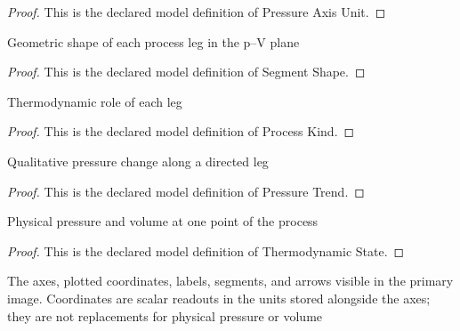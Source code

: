 \begin{proof}
  This is the declared model definition of Pressure Axis Unit.
\end{proof}
\begin{definition}
  \label{def:physics:phyx-mini-0402:phyxminiproblems-problemphyxmini0402-segmentshape}
  Geometric shape of each process leg in the p--V plane
\end{definition}
\begin{proof}
  This is the declared model definition of Segment Shape.
\end{proof}
\begin{definition}
  \label{def:physics:phyx-mini-0402:phyxminiproblems-problemphyxmini0402-processkind}
  Thermodynamic role of each leg
\end{definition}
\begin{proof}
  This is the declared model definition of Process Kind.
\end{proof}
\begin{definition}
  \label{def:physics:phyx-mini-0402:phyxminiproblems-problemphyxmini0402-pressuretrend}
  Qualitative pressure change along a directed leg
\end{definition}
\begin{proof}
  This is the declared model definition of Pressure Trend.
\end{proof}
\begin{definition}
  \label{def:physics:phyx-mini-0402:phyxminiproblems-problemphyxmini0402-thermodynamicstate}
  Physical pressure and volume at one point of the process
\end{definition}
\begin{proof}
  This is the declared model definition of Thermodynamic State.
\end{proof}
\begin{definition}
  \label{def:physics:phyx-mini-0402:phyxminiproblems-problemphyxmini0402-pressurevolumefigure}
  The axes, plotted coordinates, labels, segments, and arrows visible in the primary image. Coordinates are scalar readouts in the units stored alongside the axes; they are not replacements for physical pressure or volume
\end{definition}
